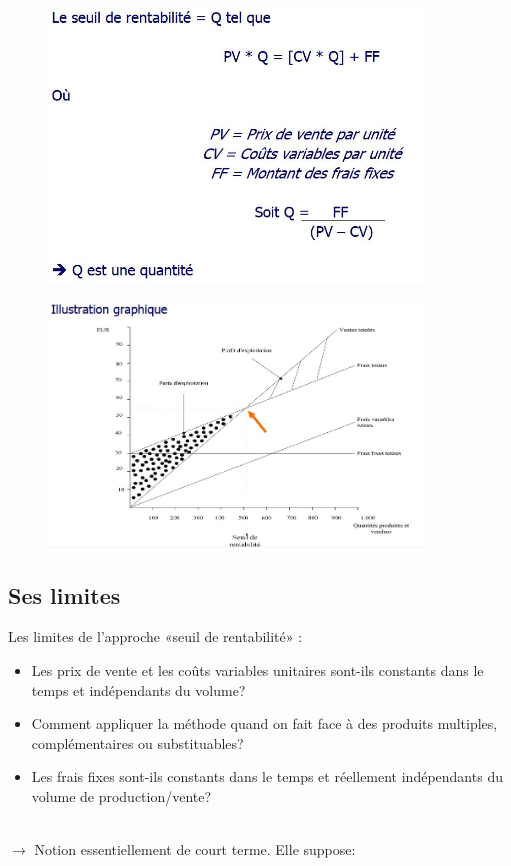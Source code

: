 \documentclass{article}
\begin{document}
\begin{figure}[H]
	\includegraphics[width=10cm]{bep.jpg}
\end{figure}

\begin{figure}[H]
	\centering
	\includegraphics[width=10cm]{bep-graphe.jpg}
\end{figure}

\subsection{Ses limites}
Les limites de l’approche «seuil de rentabilité» :
\begin{itemize}
	\item Les prix de vente et les coûts variables unitaires sont-ils constants dans 
	le temps et indépendants du volume?
	\item Comment appliquer la méthode quand on fait face à des produits 
	multiples, complémentaires ou substituables?
	\item Les frais fixes sont-ils constants dans le temps et réellement
	indépendants du volume de production/vente?
\end{itemize}
~\\
$\rightarrow$ Notion essentiellement de court terme. Elle suppose:
\end{document}
